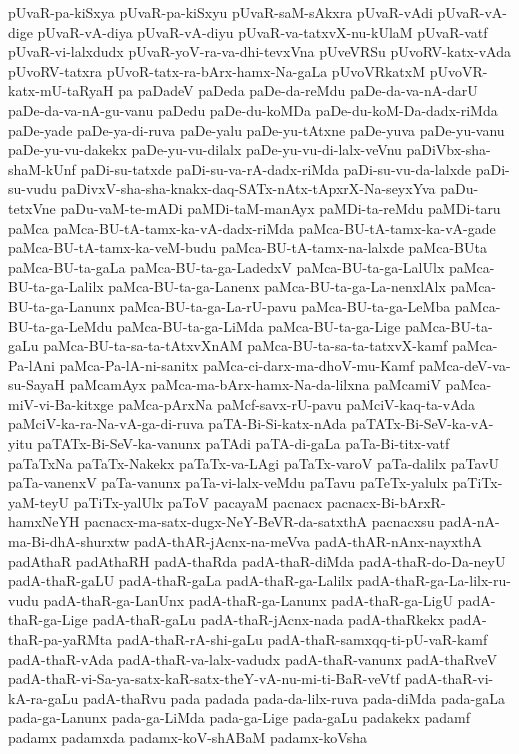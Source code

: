 {pUvaR-pa-kiSxya
pUvaR-pa-kiSxyu
pUvaR-saM-sAkxra
pUvaR-vAdi
pUvaR-vA-dige
pUvaR-vA-diya
pUvaR-vA-diyu
pUvaR-va-tatxvX-nu-kUlaM
pUvaR-vatf
pUvaR-vi-lalxdudx
pUvaR-yoV-ra-va-dhi-tevxVna
pUveVRSu
pUvoRV-katx-vAda
pUvoRV-tatxra
pUvoR-tatx-ra-bArx-hamx-Na-gaLa
pUvoVRkatxM
pUvoVR-katx-mU-taRyaH
pa
paDadeV
paDeda
paDe-da-reMdu
paDe-da-va-nA-darU
paDe-da-va-nA-gu-vanu
paDedu
paDe-du-koMDa
paDe-du-koM-Da-dadx-riMda
paDe-yade
paDe-ya-di-ruva
paDe-yalu
paDe-yu-tAtxne
paDe-yuva
paDe-yu-vanu
paDe-yu-vu-dakekx
paDe-yu-vu-dilalx
paDe-yu-vu-di-lalx-veVnu
paDiVbx-sha-shaM-kUnf
paDi-su-tatxde
paDi-su-va-rA-dadx-riMda
paDi-su-vu-da-lalxde
paDi-su-vudu
paDivxV-sha-sha-knakx-daq-SATx-nAtx-tApxrX-Na-seyxYva
paDu-tetxVne
paDu-vaM-te-mADi
paMDi-taM-manAyx
paMDi-ta-reMdu
paMDi-taru
paMca
paMca-BU-tA-tamx-ka-vA-dadx-riMda
paMca-BU-tA-tamx-ka-vA-gade
paMca-BU-tA-tamx-ka-veM-budu
paMca-BU-tA-tamx-na-lalxde
paMca-BUta
paMca-BU-ta-gaLa
paMca-BU-ta-ga-LadedxV
paMca-BU-ta-ga-LalUlx
paMca-BU-ta-ga-Lalilx
paMca-BU-ta-ga-Lanenx
paMca-BU-ta-ga-La-nenxlAlx
paMca-BU-ta-ga-Lanunx
paMca-BU-ta-ga-La-rU-pavu
paMca-BU-ta-ga-LeMba
paMca-BU-ta-ga-LeMdu
paMca-BU-ta-ga-LiMda
paMca-BU-ta-ga-Lige
paMca-BU-ta-gaLu
paMca-BU-ta-sa-ta-tAtxvXnAM
paMca-BU-ta-sa-ta-tatxvX-kamf
paMca-Pa-lAni
paMca-Pa-lA-ni-sanitx
paMca-ci-darx-ma-dhoV-mu-Kamf
paMca-deV-va-su-SayaH
paMcamAyx
paMca-ma-bArx-hamx-Na-da-lilxna
paMcamiV
paMca-miV-vi-Ba-kitxge
paMca-pArxNa
paMcf-savx-rU-pavu
paMciV-kaq-ta-vAda
paMciV-ka-ra-Na-vA-ga-di-ruva
paTA-Bi-Si-katx-nAda
paTATx-Bi-SeV-ka-vA-yitu
paTATx-Bi-SeV-ka-vanunx
paTAdi
paTA-di-gaLa
paTa-Bi-titx-vatf
paTaTxNa
paTaTx-Nakekx
paTaTx-va-LAgi
paTaTx-varoV
paTa-dalilx
paTavU
paTa-vanenxV
paTa-vanunx
paTa-vi-lalx-veMdu
paTavu
paTeTx-yalulx
paTiTx-yaM-teyU
paTiTx-yalUlx
paToV
pacayaM
pacnacx
pacnacx-Bi-bArxR-hamxNeYH
pacnacx-ma-satx-dugx-NeY-BeVR-da-satxthA
pacnacxsu
padA-nA-ma-Bi-dhA-shurxtw
padA-thAR-jAcnx-na-meVva
padA-thAR-nAnx-nayxthA
padAthaR
padAthaRH
padA-thaRda
padA-thaR-diMda
padA-thaR-do-Da-neyU
padA-thaR-gaLU
padA-thaR-gaLa
padA-thaR-ga-Lalilx
padA-thaR-ga-La-lilx-ru-vudu
padA-thaR-ga-LanUnx
padA-thaR-ga-Lanunx
padA-thaR-ga-LigU
padA-thaR-ga-Lige
padA-thaR-gaLu
padA-thaR-jAcnx-nada
padA-thaRkekx
padA-thaR-pa-yaRMta
padA-thaR-rA-shi-gaLu
padA-thaR-samxqq-ti-pU-vaR-kamf
padA-thaR-vAda
padA-thaR-va-lalx-vadudx
padA-thaR-vanunx
padA-thaRveV
padA-thaR-vi-Sa-ya-satx-kaR-satx-theY-vA-nu-mi-ti-BaR-veVtf
padA-thaR-vi-kA-ra-gaLu
padA-thaRvu
pada
padada
pada-da-lilx-ruva
pada-diMda
pada-gaLa
pada-ga-Lanunx
pada-ga-LiMda
pada-ga-Lige
pada-gaLu
padakekx
padamf
padamx
padamxda
padamx-koV-shABaM
padamx-koVsha
}
